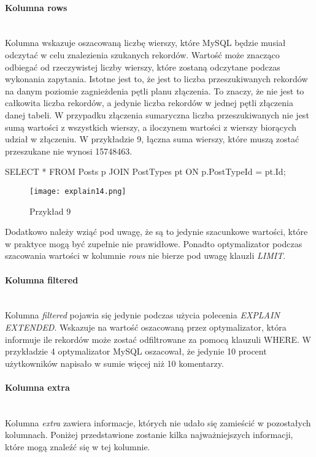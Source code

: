 \paragraph{Kolumna rows}\leavevmode\\
Kolumna wskazuje oszacowaną liczbę wierszy, które MySQL będzie musiał odczytać w celu znalezienia szukanych rekordów. Wartość może znacząco odbiegać od rzeczywistej liczby wierszy, które zostaną odczytane podczas wykonania zapytania. Istotne jest to, że jest to liczba przeszukiwanych rekordów na danym poziomie zagnieżdenia pętli planu złączenia. To znaczy, że nie jest to całkowita liczba rekordów, a jedynie liczba rekordów w jednej pętli złączenia danej tabeli. W przypadku złączenia sumaryczna liczba przeszukiwanych nie jest sumą wartości z wszystkich wierszy, a iloczynem wartości z wierszy biorących udział w złączeniu. W przykładzie 9, łączna suma wierszy, które muszą zostać przeszukane nie wynosi 15748463.
\begin{spverbatim}
	SELECT * FROM Posts p JOIN PostTypes pt ON p.PostTypeId = pt.Id;
\end{spverbatim}
\begin{figure}[H]
	\texttt{[image: explain14.png]} 
	\caption{Przykład 9}
\end{figure}
Dodatkowo należy wziąć pod uwagę, że są to jedynie szacunkowe wartości, które w praktyce mogą być zupełnie nie prawidłowe. Ponadto optymalizator podczas szacowania wartości w kolumnie \textit{rows} nie bierze pod uwagę klauzli \textit{LIMIT}.

\paragraph{Kolumna filtered}\leavevmode\\
Kolumna \textit{filtered} pojawia się jedynie podczas użycia polecenia \textit{EXPLAIN EXTENDED}. Wskazuje na wartość oszacowaną przez optymalizator, która informuje ile rekordów może zostać odfiltrowane za pomocą klauzuli WHERE. W przykładzie 4 optymalizator MySQL oszacował, że jedynie 10 procent użytkowników napisało w sumie więcej niż 10 komentarzy. 

\paragraph{Kolumna extra}\leavevmode\\
Kolumna \textit{extra} zawiera informacje, których nie udało się zamieścić w pozostałych kolumnach. Poniżej przedstawione zostanie kilka najważniejszych informacji, które mogą znaleźć się w tej kolumnie.

